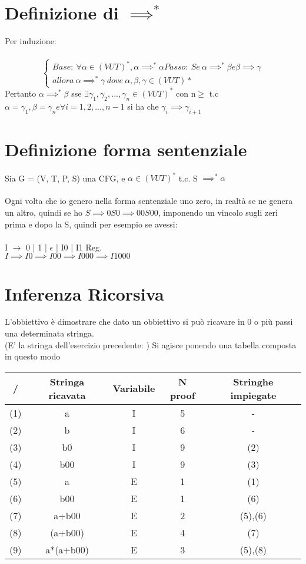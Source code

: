 \documentclass[12pt, a4paper, openany, oneside]{book}
\begin{document}
\section{Definizione di $\implies ^{*}$}
Per induzione: \\ \\
$$\begin{cases}
Base: ~\forall \alpha \in (V U T)^{*}, \alpha \implies ^{*} \alpha
Passo: ~Se~ \alpha \implies ^{*} \beta e \beta \implies \gamma \\
allora~ \alpha \implies ^{*} \gamma ~ dove ~ \alpha, \beta, \gamma 
\in (V U T)*
\end{cases}$$
Pertanto $\alpha \implies ^{*} \beta$ sse $\exists \gamma _{1}, \gamma _{2}, 
..., \gamma _{n} \in (VUT)^{*}$ con n$\geq$ t.c
$\alpha = \gamma _{1}, \beta = \gamma _{n} e \forall i = 1, 2, ..., n-1$ si ha che
$\gamma _{i} \implies \gamma _{i+1}$ 
\section{Definizione forma sentenziale}
Sia G = (V, T, P, S) una CFG, e $\alpha \in (VUT)^{*}$ t.c. S $\implies ^{*} \alpha$ \\ \\
Ogni volta che io genero nella forma sentenziale uno zero, in realtà se ne 
genera un altro, quindi se ho $S \implies 0S0 \implies 00S00$, imponendo un vincolo
sugli zeri prima e dopo la S, quindi per esempio se avessi: \\ \\
I $\to$ 0 | 1 | $\epsilon$ | I0 | I1 Reg. \\
$I \implies I0 \implies I00 \implies I000 \implies I1000 $
\section{Inferenza Ricorsiva}
L'obbiettivo è dimostrare che dato un obbiettivo si può ricavare in 0 o più passi
una determinata stringa. \\ (E' la stringa dell'esercizio precedente: )
Si agisce ponendo una tabella composta in questo modo 
\begin{center}
\begin{tabular}{ |c|c|c|c|c| } 
\hline
/ & Stringa ricavata & Variabile & N proof & Stringhe impiegate\\
\hline
(1) & a & I & 5 & - \\
(2) & b & I & 6 & -  \\
(3) & b0 & I & 9 & (2)\\
(4) & b00 & I & 9 & (3)\\
(5) & a & E & 1 & (1)\\
(6) & b00 & E & 1 & (6)\\
(7) & a+b00 & E & 2 & (5),(6)\\
(8) & (a+b00) & E & 4 & (7)\\
(9) & a*(a+b00) & E & 3 & (5),(8)\\
\hline
\end{tabular}
\end{center}
\end{document}
